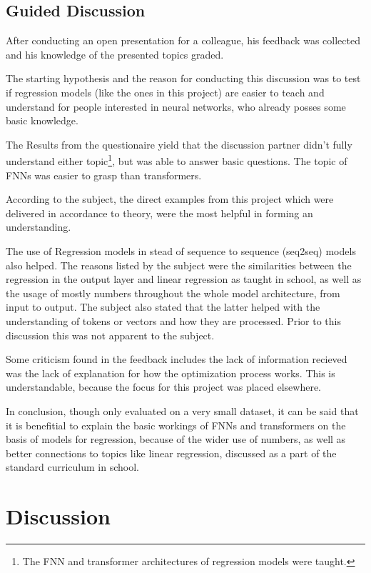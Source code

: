 \documentclass{article}
\begin{document}
\subsection{Guided Discussion}

After conducting an open presentation for a colleague, his feedback was collected and his knowledge of the presented topics graded. 

The starting hypothesis and the reason for conducting this discussion was to test if regression models (like the ones in this project) are easier to teach and understand for people interested in neural networks, who already posses some basic knowledge.

The Results from the questionaire yield that the discussion partner didn't fully understand either topic\footnote{The FNN and transformer architectures of regression models were taught.}, but was able to answer basic questions. The topic of FNNs was easier to grasp than transformers.

According to the subject, the direct examples from this project which were delivered in accordance to theory, were the most helpful in forming an understanding. 

The use of Regression models in stead of sequence to sequence (seq2seq) models also helped. The reasons listed by the subject were the similarities between the regression in the output layer and linear regression as taught in school, as well as the usage of mostly numbers throughout the whole model architecture, from input to output. The subject also stated that the latter helped with the understanding of tokens or vectors and how they are processed. Prior to this discussion this was not apparent to the subject.

Some criticism found in the feedback includes the lack of information recieved was the lack of explanation for how the optimization process works. This is understandable, because the focus for this project was placed elsewhere.

In conclusion, though only evaluated on a very small dataset, it can be said that it is benefitial to explain the basic workings of FNNs and transformers on the basis of models for regression, because of the wider use of numbers, as well as better connections to topics like linear regression, discussed as a part of the standard curriculum in school.

\section{Discussion}
\end{document}

